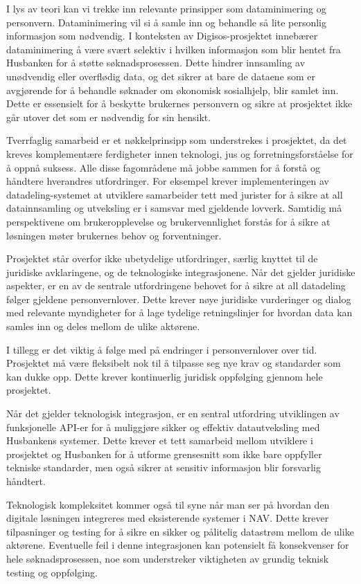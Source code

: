 \documentclass[a4paper, 12pt]{article}  %
\begin{document}
I lys av teori kan vi trekke inn relevante prinsipper som dataminimering og personvern. 
Dataminimering vil si  å samle inn og behandle så lite personlig informasjon som nødvendig.
I konteksten av Digisos-prosjektet innebærer dataminimering å være svært selektiv i hvilken informasjon som blir hentet fra Husbanken for å støtte søknadsprosessen.
Dette hindrer innsamling av unødvendig eller overflødig data, og det sikrer at bare de dataene som er avgjørende for å behandle søknader om økonomisk sosialhjelp, blir samlet inn.
Dette er essensielt for å beskytte brukernes personvern og sikre at prosjektet ikke går utover det som er nødvendig for sin hensikt.

Tverrfaglig samarbeid er et nøkkelprinsipp som understrekes i prosjektet, da det kreves komplementære ferdigheter innen teknologi, jus og forretningsforståelse for å oppnå suksess.
Alle disse fagområdene må jobbe sammen for å forstå og håndtere hverandres utfordringer. 
For eksempel krever implementeringen av datadeling-systemet at utviklere samarbeider tett med jurister for å sikre at all datainnsamling og utveksling er i samsvar med gjeldende lovverk. 
Samtidig må perspektivene om brukeropplevelse og brukervennlighet forstås for å sikre at løsningen møter brukernes behov og forventninger.

Prosjektet står overfor ikke ubetydelige utfordringer, særlig knyttet til de juridiske avklaringene, og de teknologiske integrasjonene. 
Når det gjelder juridiske aspekter, er en av de sentrale utfordringene behovet for å sikre at all datadeling følger gjeldene personvernlover.
Dette krever nøye juridiske vurderinger og dialog med relevante myndigheter for å lage tydelige retningslinjer for hvordan data kan samles inn og deles mellom de ulike aktørene.

I tillegg er det viktig å følge med på endringer i personvernlover over tid. 
Prosjektet må være fleksibelt nok til å tilpasse seg nye krav og standarder som kan dukke opp. 
Dette krever kontinuerlig juridisk oppfølging gjennom hele prosjektet.

Når det gjelder teknologisk integrasjon, er en sentral utfordring utviklingen av funksjonelle API-er for å muliggjøre sikker og effektiv datautveksling med Husbankens systemer. 
Dette krever et tett samarbeid mellom utviklere i prosjektet og Husbanken for å utforme grensesnitt som ikke bare oppfyller tekniske standarder, men også sikrer at sensitiv informasjon blir forsvarlig håndtert.

Teknologisk kompleksitet kommer også til syne når man ser på hvordan den digitale løsningen integreres med eksisterende systemer i NAV. 
Dette krever tilpasninger og testing for å sikre en sikker og pålitelig datastrøm mellom de ulike aktørene.
Eventuelle feil i denne integrasjonen kan potensielt få konsekvenser for hele søknadsprosessen, noe som understreker viktigheten av grundig teknisk testing og oppfølging.
\end{document}
